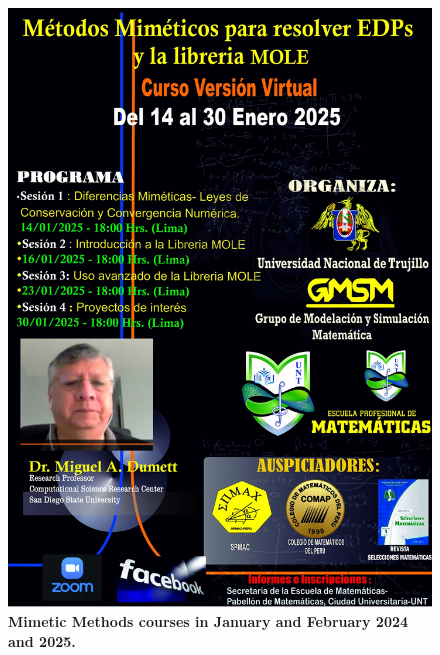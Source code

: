 \begin{figure}[ht!]
	\includegraphics[width=.3\paperwidth]{mole2025}
	\caption*{\bfseries Mimetic Methods courses in January and February 2024 and 2025.}
\end{figure}

